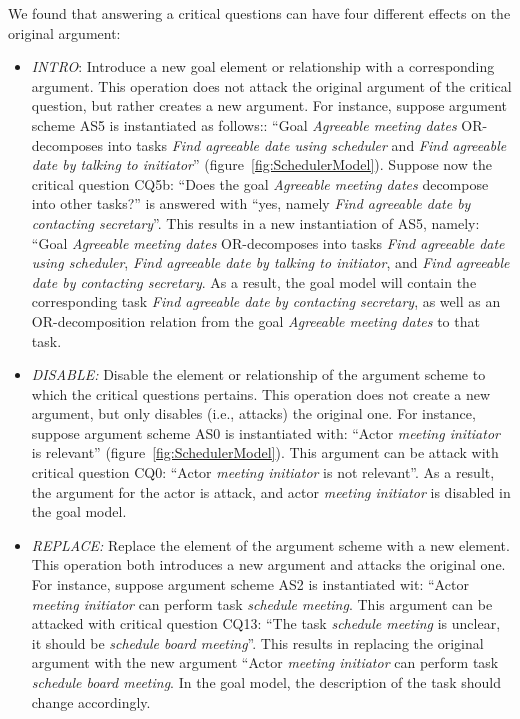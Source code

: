 We found that answering a critical questions can have four different effects on the original argument:
\begin{itemize}
\item \emph{INTRO}: Introduce a new goal element or relationship with a corresponding argument. This operation does not attack the original argument of the critical question, but rather creates a new argument. For instance, suppose argument scheme AS5 is instantiated as follows:: ``Goal \emph{Agreeable meeting dates} OR-decomposes into tasks \emph{Find agreeable date using scheduler} and \emph{Find agreeable date by talking to initiator}'' (figure~\ref{fig:SchedulerModel}). Suppose now the critical question CQ5b: ``Does the goal \emph{Agreeable meeting dates} decompose into other tasks?'' is answered with ``yes, namely \emph{Find agreeable date by contacting secretary}''. This results in a new instantiation of AS5, namely: ``Goal \emph{Agreeable meeting dates} OR-decomposes into tasks \emph{Find agreeable date using scheduler}, \emph{Find agreeable date by talking to initiator}, and \emph{Find agreeable date by contacting secretary}. As a result, the goal model will contain the corresponding task \emph{Find agreeable date by contacting secretary}, as well as an OR-decomposition relation from the goal \emph{Agreeable meeting dates} to that task.
\item \emph{DISABLE:} Disable the element or relationship of the argument scheme to which the critical questions pertains. This operation does not create a new argument, but only disables (i.e., attacks) the original one. For instance, suppose argument scheme AS0 is instantiated with: ``Actor \emph{meeting initiator} is relevant'' (figure~\ref{fig:SchedulerModel}). This argument can be attack with critical question CQ0: ``Actor \emph{meeting initiator} is not relevant''. As a result, the argument for the actor is attack, and actor \emph{meeting initiator} is disabled in the goal model.
\item \emph{REPLACE:} Replace the element of the argument scheme with a new element. This operation both introduces a new argument and attacks the original one. For instance, suppose argument scheme AS2 is instantiated wit: ``Actor \emph{meeting initiator} can perform task \emph{schedule meeting}. This argument can be attacked with critical question CQ13: ``The task \emph{schedule meeting} is unclear, it should be \emph{schedule board meeting}''. This results in replacing the original argument with the new argument ``Actor \emph{meeting initiator} can perform task \emph{schedule board meeting}. In the goal model, the description of the task should change accordingly.

\end{itemize}
